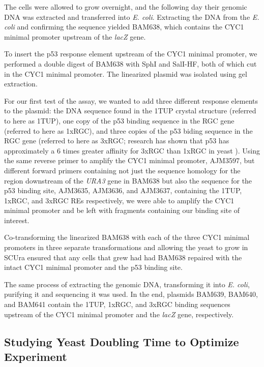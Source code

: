 The cells were allowed to grow overnight, and the following day their genomic DNA was extracted and transferred into \textit{E. coli}. Extracting the DNA from the \textit{E. coli} and confirming the sequence yielded BAM638, which contains the CYC1 minimal promoter upstream of the \textit{lacZ} gene.

To insert the p53 response element upstream of the CYC1 minimal promoter, we performed a double digest of BAM638 with SphI and SalI-HF, both of which cut in the CYC1 minimal promoter. The linearized plasmid was isolated using gel extraction.

For our first test of the assay, we wanted to add three different response elements to the plasmid: the DNA sequence found in the 1TUP crystal structure \parencite{choCrystalStructureP531994} (referred to here as 1TUP), one copy of the p53 binding sequence in the RGC gene (referred to here as 1xRGC), and three copies of the p53 biding sequence in the RGC gene (referred to here as 3xRGC; research has shown that p53 has approximately a \num{6} times greater affinity for 3xRGC than 1xRGC in yeast \parencite{scharerMammalianP53Can1992}). Using the same reverse primer to amplify the CYC1 minimal promoter, AJM3597, but different forward primers containing not just the sequence homology for the region downstream of the \textit{URA3} gene in BAM638 but also the sequence for the p53 binding site, AJM3635, AJM3636, and AJM3637, containing the 1TUP, 1xRGC, and 3xRGC REs respectively, we were able to amplify the CYC1 minimal promoter and be left with fragments containing our binding site of interest.

Co-transforming the linearized BAM638 with each of the three CYC1 minimal promoters in three separate transformations and allowing the yeast to grow in SC\textminus Ura ensured that any cells that grew had had BAM638 repaired with the intact CYC1 minimal promoter and the p53 binding site.

The same process of extracting the genomic DNA, transforming it into \textit{E. coli}, purifying it and sequencing it was used. In the end, plasmids BAM639, BAM640, and BAM641 contain the 1TUP, 1xRGC, and 3xRGC binding sequences upstream of the CYC1 minimal promoter and the \textit{lacZ} gene, respectively.

\subsection{Studying Yeast Doubling Time to Optimize Experiment}

